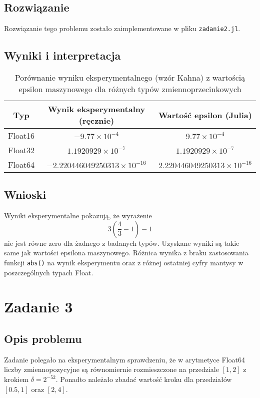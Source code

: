 \documentclass{article}
\begin{document}
\subsection{Rozwiązanie}
Rozwiązanie tego problemu zostało zaimplementowane w pliku \texttt{zadanie2.jl}.

\subsection{Wyniki i interpretacja}
\begin{table}[h!]
\centering
\renewcommand{\arraystretch}{1.3}
\begin{tabular}{|c|c|c|}
\hline
Typ & Wynik eksperymentalny (ręcznie) & Wartość epsilon (Julia) \\ 
\hline
Float16 & $-9.77 \times 10^{-4}$ & $9.77 \times 10^{-4}$ \\
Float32 & $1.1920929 \times 10^{-7}$ & $1.1920929 \times 10^{-7}$ \\
Float64 & $-2.220446049250313 \times 10^{-16}$ & $2.220446049250313 \times 10^{-16}$ \\
\hline
\end{tabular}
\caption{Porównanie wyniku eksperymentalnego (wzór Kahna) z wartością epsilon maszynowego dla różnych typów zmiennoprzecinkowych}
\end{table}

\subsection{Wnioski}
Wyniki eksperymentalne pokazują, że wyrażenie 
\[
3 \left( \frac{4}{3}-1 \right) - 1
\]
nie jest równe zero dla żadnego z badanych typów. Uzyskane wyniki są takie same jak wartości epsilona maszynowego. Różnica wynika z braku zastosowania funkcji \texttt{abs()} na wynik eksperymentu oraz z różnej ostatniej cyfry mantysy w poszczególnych typach Float.

\section{Zadanie 3}
\subsection{Opis problemu}
Zadanie polegało na eksperymentalnym sprawdzeniu, że w arytmetyce Float64 liczby zmiennopozycyjne są równomiernie rozmieszczone na przedziale $[1,2]$ z krokiem $\delta = 2^{-52}$. Ponadto należało zbadać wartość kroku dla przedziałów $[0.5,1]$ oraz $[2,4]$.
\end{document}
